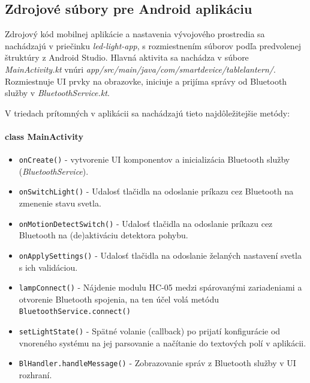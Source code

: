 \documentclass[12pt, a4paper]{article}
\begin{document}
\subsection{Zdrojové súbory pre Android aplikáciu}
Zdrojový kód mobilnej aplikácie a nastavenia vývojového prostredia sa nachádzajú v priečinku \emph{led-light-app}, s rozmiestnením súborov podľa predvolenej štruktúry z Android Studio. Hlavná aktivita sa nachádza v súbore \emph{MainActivity.kt} vnúri \emph{app/src/main/java/com/smartdevice/tablelantern/}. Rozmiestnuje UI prvky na obrazovke,
iniciuje a prijíma správy od Bluetooth služby v \emph{BluetoothService.kt}.

V triedach prítomných v aplikácii sa nachádzajú tieto najdôležitejšie metódy:
\paragraph{class MainActivity}
\begin{itemize}
\itemsep0pt
\item \verb|onCreate()| - vytvorenie UI komponentov a inicializácia Bluetooth služby (\emph{BluetoothService}).
\item \verb|onSwitchLight()| - Udalosť tlačidla na odoslanie príkazu cez Bluetooth na zmenenie stavu svetla. 
\item \verb|onMotionDetectSwitch()| -  Udalosť tlačidla na odoslanie príkazu cez Bluetooth na (de)aktiváciu detektora pohybu.
\item \verb|onApplySettings()| - Udalosť tlačidla na odoslanie želaných nastavení svetla s ich validáciou.
\item \verb|lampConnect()| - Nájdenie modulu HC-05 medzi spárovanými zariadeniami a otvorenie Bluetooth spojenia, na ten účel volá metódu \verb|BluetoothService.connect()|
\item \verb|setLightState()| - Spätné volanie (callback) po prijatí konfigurácie od vnoreného systému na jej parsovanie a načítanie do textových polí v aplikácii.
\item \verb|BlHandler.handleMessage()| - Zobrazovanie správ z Bluetooth služby v UI rozhraní.
\end{itemize}
\end{document}
